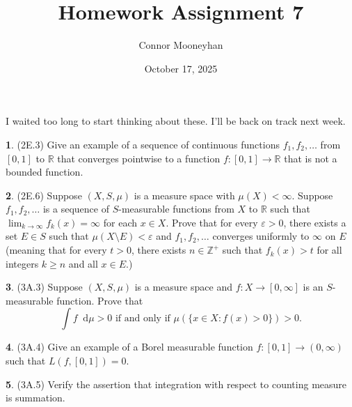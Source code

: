 \documentclass[12pt]{article}
\title{Homework Assignment 7}
\author{Connor Mooneyhan}
\date{October 17, 2025}
\newcommand{\dd}{\mathop{}\!\mathrm{d}}
\theoremstyle{definition}
\newtheorem{ex}{}
\begin{document}
\maketitle

I waited too long to start thinking about these. I'll be back on track next week.

\begin{ex}
	(2E.3)
	Give an example of a sequence of continuous functions $f_1, f_2, \dots$ from $[0, 1]$ to $\mathbb{R}$ that converges pointwise to a function $f : [0, 1] \to \mathbb{R}$ that is not a bounded function.
\end{ex}

\begin{ex}
	(2E.6)
	Suppose $(X, S, \mu)$ is a measure space with $\mu(X) < \infty$.
	Suppose $f_1, f_2, \dots$ is a sequence of $S$-measurable functions from $X$ to $\mathbb{R}$ such that $\lim_{k \to \infty}f_k(x) = \infty$ for each $x \in X$.
	Prove that for every $\varepsilon > 0$, there exists a set $E \in S$ such that $\mu(X \setminus E) < \varepsilon$ and $f_1, f_2, \dots$ converges uniformly to $\infty$ on $E$ (meaning that for every $t > 0$, there exists $n \in \mathbb{Z}^+$ such that $f_k(x) > t$ for all integers $k \geq n$ and all $x \in E$.)
\end{ex}

\begin{ex}
	(3A.3)
	Suppose $(X, S, \mu)$ is a measure space and $f : X \to [0, \infty]$ is an $S$-measurable function.
	Prove that \begin{equation*}
		\int f \dd \mu > 0 \text{ if and only if } \mu(\lbrace x \in X : f(x) > 0 \rbrace) > 0.
	\end{equation*}
\end{ex}

\begin{ex}
	(3A.4)
	Give an example of a Borel measurable function $f : [0, 1] \to (0, \infty)$ such that $L(f, [0, 1]) = 0$.
\end{ex}

\begin{ex}
	(3A.5)
	Verify the assertion that integration with respect to counting measure is summation.
\end{ex}
\end{document}
